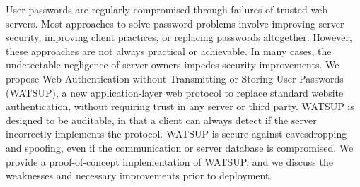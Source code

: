 % 
\noindent User passwords are regularly compromised through failures of trusted web servers. Most approaches to solve password problems involve improving server security, improving client practices, or replacing passwords altogether. However, these approaches are not always practical or achievable. In many cases, the undetectable negligence of server owners impedes security improvements. We propose Web Authentication without Transmitting or Storing User Passwords (WATSUP), a new application-layer web protocol to replace standard website authentication, without requiring trust in any server or third party. WATSUP is designed to be auditable, in that a client can always detect if the server incorrectly implements the protocol. WATSUP is secure against eavesdropping and spoofing, even if the communication or server database is compromised. We provide a proof-of-concept implementation of WATSUP, and we discuss the weaknesses and necessary improvements prior to deployment.
